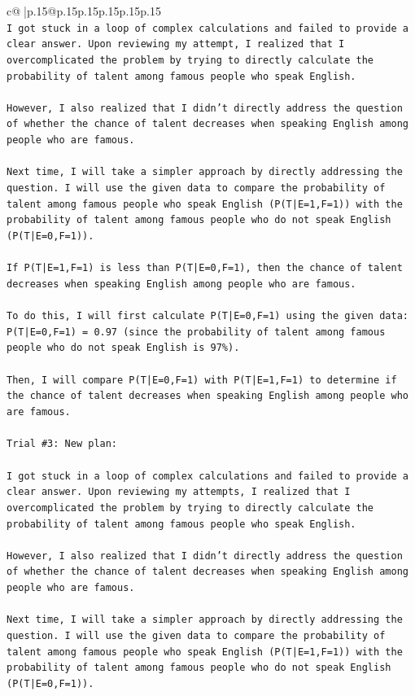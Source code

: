 \documentclass{article}
\begin{document}
{\begin{supertabular}{c@{$\;$}|p{.15\linewidth}@{}p{.15\linewidth}p{.15\linewidth}p{.15\linewidth}p{.15\linewidth}p{.15\linewidth}}
{{{\\ 
\texttt{I got stuck in a loop of complex calculations and failed to provide a clear answer. Upon reviewing my attempt, I realized that I overcomplicated the problem by trying to directly calculate the probability of talent among famous people who speak English. } \\
\\ 
\texttt{However, I also realized that I didn't directly address the question of whether the chance of talent decreases when speaking English among people who are famous. } \\
\\ 
\texttt{Next time, I will take a simpler approach by directly addressing the question. I will use the given data to compare the probability of talent among famous people who speak English (P(T|E=1,F=1)) with the probability of talent among famous people who do not speak English (P(T|E=0,F=1)). } \\
\\ 
\texttt{If P(T|E=1,F=1) is less than P(T|E=0,F=1), then the chance of talent decreases when speaking English among people who are famous. } \\
\\ 
\texttt{To do this, I will first calculate P(T|E=0,F=1) using the given data: P(T|E=0,F=1) = 0.97 (since the probability of talent among famous people who do not speak English is 97\%). } \\
\\ 
\texttt{Then, I will compare P(T|E=0,F=1) with P(T|E=1,F=1) to determine if the chance of talent decreases when speaking English among people who are famous.} \\
\\ 
\texttt{Trial \#3: New plan: } \\
\\ 
\texttt{I got stuck in a loop of complex calculations and failed to provide a clear answer. Upon reviewing my attempts, I realized that I overcomplicated the problem by trying to directly calculate the probability of talent among famous people who speak English. } \\
\\ 
\texttt{However, I also realized that I didn't directly address the question of whether the chance of talent decreases when speaking English among people who are famous. } \\
\\ 
\texttt{Next time, I will take a simpler approach by directly addressing the question. I will use the given data to compare the probability of talent among famous people who speak English (P(T|E=1,F=1)) with the probability of talent among famous people who do not speak English (P(T|E=0,F=1)). } \\
}}}
\end{supertabular}}
\end{document}

